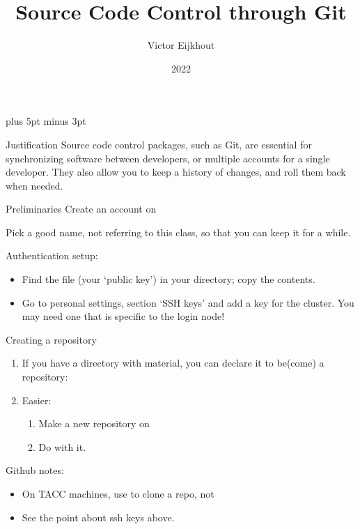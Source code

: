\documentclass[11pt,headernav]{beamer}
\begin{document}
\parskip=10pt plus 5pt minus 3pt

\title{Source Code Control through Git}
\author{Victor Eijkhout}
\date{2022}

\begin{frame}{}
  \titlepage
\end{frame}

\begin{numberedframe}{Justification}
  Source code control packages, such as Git,
  are essential for synchronizing software between
  developers, or multiple accounts for a single developer.
  They also allow you to keep a history of changes,
  and roll them back when needed.
\end{numberedframe}

\begin{numberedframe}{Preliminaries}
  Create an account on 

  Pick a good name, not referring to this class,
  so that you can keep it for a while.

  Authentication setup:
  \begin{itemize}
  \item Find the  file (your `public key') in your  directory;
    copy the contents.
  \item
    Go to personal settings, section `SSH keys' and add a key
    for the cluster. You may need one that is specific to the login node!
  \end{itemize}

\end{numberedframe}

\begin{numberedframe}{Creating a repository}
  \begin{enumerate}
  \item If you have a directory with material,
    you can declare it to be(come) a repository:\\
  \item Easier:
    \begin{enumerate}
    \item Make a new repository on 
    \item Do  with it.
    \end{enumerate}
  \end{enumerate}
  Github notes:
  \begin{itemize}
  \item On TACC machines, use  to clone a repo, not 
  \item See the point about ssh keys above.
  \end{itemize}
\end{numberedframe}
\end{document}

